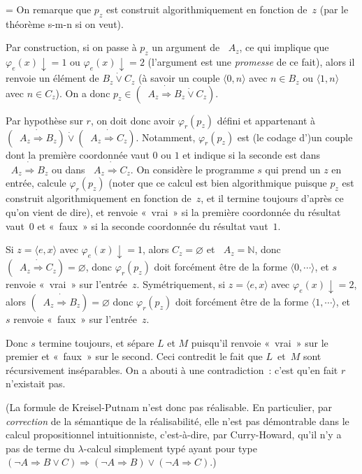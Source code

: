\documentclass[12pt,a4paper]{article}
\theoremstyle{definition}
\newcommand{\dottedlimp}{\mathbin{\dot\Rightarrow}}
\newcommand{\dottedlor}{\mathbin{\dot\lor}}
\newcommand{\dottedneg}{\mathop{\dot\neg}}
\newif\ifcorrige
\newenvironment{corrige}%
{\ifcorrige\relax\else\setbox0=\vbox\bgroup\fi%
\smallbreak\footnotesize\noindent{\underbar{\textit{Corrigé.}}\quad}}
{{\hbox{}\nobreak\hfill\checkmark}%
\ifcorrige\relax\else\egroup\fi\par}
\begin{document}
\begin{corrige}
On remarque que $p_z$ est construit algorithmiquement en fonction
de $z$ (par le théorème s-m-n si on veut).

Par construction, si on passe à $p_z$ un argument de $\dottedneg A_z$,
ce qui implique que $\varphi_e(x){\downarrow} = 1$ ou
$\varphi_e(x){\downarrow} = 2$ (l'argument est une \emph{promesse} de
ce fait), alors il renvoie un élément de $B_z \dottedlor C_z$ (à
savoir un couple $\langle 0,n\rangle$ avec $n\in B_z$ ou $\langle
1,n\rangle$ avec $n\in C_z$).  On a donc $p_z \in (\dottedneg A_z
\dottedlimp B_z\dottedlor C_z)$.

Par hypothèse sur $r$, on doit donc avoir $\varphi_r(p_z)$ défini et
appartenant à $(\dottedneg A_z\dottedlimp B_z) \dottedlor (\dottedneg
A_z\dottedlimp C_z)$.  Notamment, $\varphi_r(p_z)$ est (le codage
d')un couple dont la première coordonnée vaut $0$ ou $1$ et indique si
la seconde est dans $\dottedneg A_z\dottedlimp B_z$ ou dans
$\dottedneg A_z\dottedlimp C_z$.  On considère le programme $s$ qui
prend un $z$ en entrée, calcule $\varphi_r(p_z)$ (noter que ce calcul
est bien algorithmique puisque $p_z$ est construit algorithmiquement
en fonction de $z$, et il termine toujours d'après ce qu'on vient de
dire), et renvoie « vrai » si la première coordonnée du résultat
vaut $0$ et « faux » si la seconde coordonnée du résultat vaut $1$.

Si $z = \langle e,x\rangle$ avec $\varphi_e(x){\downarrow} = 1$, alors
$C_z = \varnothing$ et $\dottedneg A_z = \mathbb{N}$, donc
$(\dottedneg A_z\dottedlimp C_z) = \varnothing$, donc $\varphi_r(p_z)$
doit forcément être de la forme $\langle 0,\cdots\rangle$, et $s$
renvoie « vrai » sur l'entrée $z$.  Symétriquement, si $z = \langle
e,x\rangle$ avec $\varphi_e(x){\downarrow} = 2$, alors $(\dottedneg
A_z\dottedlimp B_z) = \varnothing$ donc $\varphi_r(p_z)$ doit
forcément être de la forme $\langle 1,\cdots\rangle$, et $s$ renvoie
« faux » sur l'entrée $z$.

Donc $s$ termine toujours, et sépare $L$ et $M$ puisqu'il renvoie
« vrai » sur le premier et « faux » sur le second.  Ceci contredit le
fait que $L$ et $M$ sont récursivement inséparables.  On a abouti à
une contradiction : c'est qu'en fait $r$ n'existait pas.

(La formule de Kreisel-Putnam n'est donc pas réalisable.  En
particulier, par \emph{correction} de la sémantique de la
réalisabilité, elle n'est pas démontrable dans le calcul
propositionnel intuitionniste, c'est-à-dire, par Curry-Howard, qu'il
n'y a pas de terme du $\lambda$-calcul simplement typé ayant pour type
$(\neg A \Rightarrow B\lor C) \Rightarrow (\neg A\Rightarrow B) \lor
(\neg A\Rightarrow C)$.)
\end{corrige}
\end{document}
